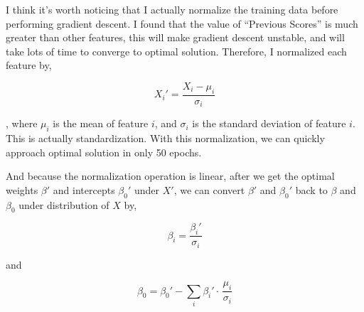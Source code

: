 \documentclass[twocolumn]{extarticle}
\begin{document}
I think it's worth noticing that I actually normalize the training data before performing gradient descent. I found that the value of ``Previous Scores'' is much greater than other features, this will make gradient descent unstable, and will take lots of time to converge to optimal solution. Therefore, I normalized each feature by,

\begin{equation*}
X_{i}' = \frac{X_i - \mu_i}{\sigma_i}
\end{equation*}

, where $\mu_i$ is the mean of feature $i$, and $\sigma_i$ is the standard deviation of feature $i$. This is actually standardization. With this normalization, we can quickly approach optimal solution in only 50 epochs.

And because the normalization operation is linear, after we get the optimal weights $\beta'$ and intercepts $\beta_0'$ under $X'$, we can convert $\beta'$ and $\beta_0'$ back to $\beta$ and $\beta_0$ under distribution of $X$ by,

\begin{equation*}
\beta_i = \frac{\beta_i'}{\sigma_i}
\end{equation*}

and

\begin{equation*}
\beta_0 = \beta_0' - \sum_{i} \beta_i' \cdot \, \frac{\mu_i}{\sigma_i}
\end{equation*}
\end{document}
